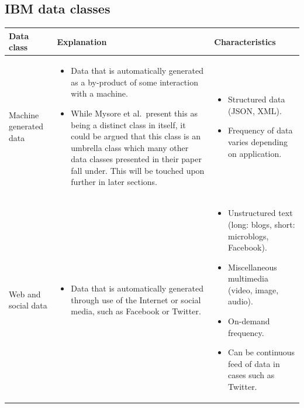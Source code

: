 \documentclass[a4paper,11pt]{article}
\begin{document}
\begin{appendices}
\renewcommand\thetable{\thesection\arabic{table}}
\renewcommand\thefigure{\thesection\arabic{figure}}
\section{IBM data classes} \label{app:ibm_data_classes}

\begin{table}[H]
\footnotesize
\centering
\hspace*{-2cm}
\begin{tabular}{ | p{2cm} | p{8cm} | p{7.5cm} | }
\hline
\textbf{Data class}          &  \textbf{Explanation} & \textbf{Characteristics}   \\ \hline

Machine generated data
&
\begin{itemize}[leftmargin=*]
  \item Data that is automatically generated as a by-product of some interaction with a machine.
  \item While Mysore et al.\ present this as being a distinct class in itself, it could be argued that this class
  is an umbrella class which many other data classes presented in their paper fall under. This will be touched upon
  further in later sections.
\end{itemize}
&
\begin{itemize}[leftmargin=*]
  \item Structured data (JSON, XML).
  \item Frequency of data varies depending on application.
\end{itemize}
\\ \hline

Web and social data
&
\begin{itemize}[leftmargin=*]
  \item Data that is automatically generated through use of the Internet or social media, such as Facebook or Twitter.
\end{itemize}
&
\begin{itemize}[leftmargin=*]
  \item Unstructured text (long: blogs, short: microblogs, Facebook).
  \item Miscellaneous multimedia (video, image, audio).
  \item On-demand frequency.
  \item Can be continuous feed of data in cases such as Twitter.
\end{itemize}
\\ \hline


\end{tabular}
\end{table}
\end{appendices}
\end{document}
